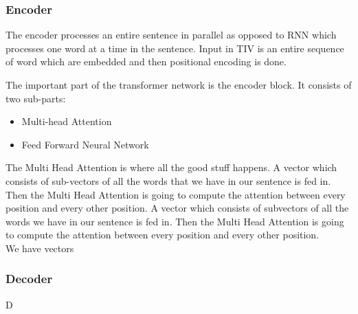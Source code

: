 \documentclass{article}
\begin{document}
\subsubsection{Encoder}
The encoder processes an entire sentence in parallel as opposed to RNN which processes one word at a time in the sentence. Input in TIV is an entire sequence of word which are embedded and then positional encoding is done.
\begin{minipage}{0.6\textwidth}

\end{minipage}
\begin{minipage}{0.5\textwidth}
The important part of the transformer network is the encoder block. It consists of two sub-parts:
\begin{itemize}
    \item Multi-head Attention
    \item Feed Forward Neural Network
\end{itemize}
\end{minipage}
The Multi Head Attention is where all the good stuff happens. A vector which consists of sub-vectors of all the words that we have in our sentence is fed in.  Then the Multi Head Attention is going to compute the attention between every position and every other position. A vector which consists of subvectors of all the words we have in our sentence is fed in. Then the Multi Head Attention is going to compute the attention between every position and every other position. \\
We have vectors 

\subsubsection{Decoder}
D
\end{document}
